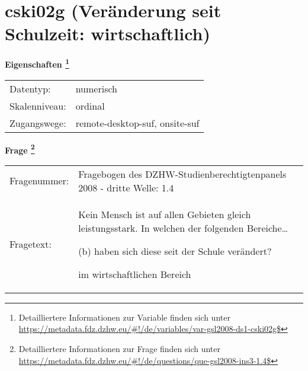 
    \setcounter{footnote}{0}

    \vspace*{-1.8cm}
	\section{cski02g (Veränderung seit Schulzeit: wirtschaftlich)}
	\label{section:cski02g}



    \vspace*{0.5cm}
    \noindent\textbf{Eigenschaften
	\footnote{Detailliertere Informationen zur Variable finden sich unter
		\url{https://metadata.fdz.dzhw.eu/\#!/de/variables/var-gsl2008-ds1-cski02g$}}}\\
	\begin{tabularx}{\hsize}{@{}lX}
	Datentyp: & numerisch \\
	Skalenniveau: & ordinal \\
	Zugangswege: &
	  remote-desktop-suf, 
	  onsite-suf
 \\
    \end{tabularx}



				\vspace*{0.5cm}
                \noindent\textbf{Frage
	                \footnote{Detailliertere Informationen zur Frage finden sich unter
		              \url{https://metadata.fdz.dzhw.eu/\#!/de/questions/que-gsl2008-ins3-1.4$}}}\\
				\begin{tabularx}{\hsize}{@{}lX}
					Fragenummer: &
					  Fragebogen des DZHW-Studienberechtigtenpanels 2008 - dritte Welle:
					  1.4
 \\
					Fragetext: & Kein Mensch ist auf allen Gebieten gleich leistungsstark. In welchen der folgenden Bereiche…\par  (b) haben sich diese seit der Schule verändert?\par  im wirtschaftlichen Bereich \\
				\end{tabularx}





